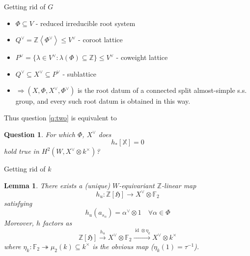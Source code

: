 \documentclass[pdf]{beamer}
\newcommand{\op}[1]{\operatorname{#1}}
\newcommand{\bbf}[1]{\mathds{#1}}
\newcommand{\Z}{\bbf{Z}}
\newcommand{\F}{\bbf{F}}
\newcommand{\X}{\bbf{X}}
\newtheorem{question}{Question}
\newtheorem*{lemma*}{Lemma}
\begin{document}
\begin{frame}{Getting rid of $G$}
   \pause \begin{itemize}
      \item<2-> $\Phi \subseteq V$ - reduced irreducible root system
      \item<3-> $Q^\vee = \Z\left<\Phi^\vee\right> \leq V^\vee$ - coroot lattice
      \item<4-> $P^\vee = \{ \lambda \in V^\vee : \lambda(\Phi) \subseteq \Z \} \leq V^\vee$ - coweight lattice 
      \item<5-> $Q^\vee \subseteq X^\vee \subseteq P^\vee$ - sublattice
      \item<7-> $\Rightarrow (X,\Phi,X^\vee,\Phi^\vee)$ is the root datum of a connected split almost-simple s.s. group, and every such root datum is obtained in this way.
   \end{itemize}
   \pause[8] Thus question \ref{q:two} is equivalent to\pause
   \begin{question}\label{q:three}
      For which $\Phi$, $X^\vee$  does
      \[ h_\ast[\X] = 0 \]
      hold true in $H^2(W,X^\vee\otimes k^\times)$?
   \end{question}
\end{frame}

\begin{frame}{Getting rid of $k$}
   \begin{lemma*}
      There exists a (unique) $W$-equivariant $\Z$-linear map
      \[ h_u: \Z[\mathfrak{H}] \longrightarrow X^\vee \otimes \F_2 \]
      satisfying
      \[ h_u(a_{s_\alpha}) = \alpha^\vee \otimes 1\quad \forall \alpha \in \Phi \]
      \pause Moreover, $h$ factors as
      \[ \Z[\mathfrak{H}] \stackrel{h_u}{\longrightarrow} X^\vee \otimes \F_2 \stackrel{\op{id}\otimes \eta_k}{\longrightarrow} X^\vee \otimes k^\times \]
      \pause where $\eta_k: \F_2 \twoheadrightarrow \mu_2(k) \subseteq k^\times$ is the obvious map \pause ($\eta_k(1) = \tau^{-1}$).
   \end{lemma*}
\end{frame}
\end{document}
